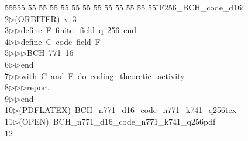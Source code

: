 %
%
\begin{tabbing}
55555 \= 55 \= 55 \= 55 \= 55 \= 55 \= 55 \= 55 \= 55 \= 55 \= 55 \= 55 \= 55 \= \>F256\_BCH\_code\_d16:\\[0pt]
2\>$\triangleright$\>(ORBITER)\ v\ 3\ \\[0pt]
3\>$\triangleright$\>$\triangleright$\>define\ F\ finite\_field\ q\ 256\ end\ \\[0pt]
4\>$\triangleright$\>$\triangleright$\>define\ C\ code\ field\ F\ \\[0pt]
5\>$\triangleright$\>$\triangleright$\>$\triangleright$\>BCH\ 771\ 16\ \\[0pt]
6\>$\triangleright$\>$\triangleright$\>end\ \\[0pt]
7\>$\triangleright$\>$\triangleright$\>with\ C\ and\ F\ do\ coding\_theoretic\_activity\ \\[0pt]
8\>$\triangleright$\>$\triangleright$\>$\triangleright$\>report\ \\[0pt]
9\>$\triangleright$\>$\triangleright$\>end\\[0pt]
10\>$\triangleright$\>(PDFLATEX)\ BCH\_n771\_d16\_code\_n771\_k741\_q256tex\\[0pt]
11\>$\triangleright$\>(OPEN)\ BCH\_n771\_d16\_code\_n771\_k741\_q256pdf\\[0pt]
12\>\end{tabbing}
